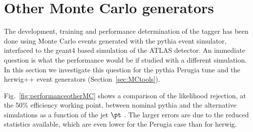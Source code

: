 


\section{Other Monte Carlo generators}\label{sec:otherMC}

The development, training and performance determination of the tagger has been done using Monte Carlo events generated with the {\sc pythia} event simulator, interfaced to the {\sc geant4} based simulation of the ATLAS detector. An immediate question is what the performance would be if studied with a different simulation. In this section we investigate this question for the {\sc pythia} Perugia tune  and the {\sc herwig++} event generators (Section~\ref{sec:MCtools}).

Fig.~\ref{fig:performanceotherMC} shows a comparison of the likelihood rejection, at the 50\% efficiency working point,  between nominal {\sc pythia} and the alternative simulations %
as a function of the jet $\pt$ . The larger errors are due to the reduced statistics available, which are even lower for the Perugia case than for {\sc herwig}.




